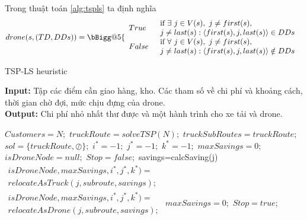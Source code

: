 \documentclass[a4paper,12pt]{report}
\makeatletter
\newcommand{\Vast}{\bBigg@{5}}
\makeatother
\begin{document}
Trong thuật toán  \ref{alg:tspls} ta định nghĩa 
$$
drone(s,(TD,DDs))= \Vast\{
\begin{array}{ll}
		True & \begin{array}{l}
		\text{if}	\	\exists \ j \in V(s),\ j \neq first(s), \\ j \neq last(s): \langle first(s),j,last(s) \rangle \in DDs
		\end{array}  \\
		False &  \begin{array}{l}
		\text{if}	\	\forall \ j \in V(s),\ j \neq first(s), \\ j \neq last(s): \langle first(s),j,last(s) \rangle \notin DDs
		\end{array}
\end{array}
$$
\begin{algorithm}[H]
\caption{TSP-LS heuristic}
\textbf{Input:} Tập các điểm cần giao hàng, kho. Các tham số về chi phí và khoảng cách, thời gian chờ đợi, mức chịu đựng của drone.\\
\textbf{Output:} Chi phí nhỏ nhất thư được và một hành trình cho xe tải và drone.
\begin{algorithmic}[1]
\State $Customers = N ;$
\State $truckRoute = solveTSP(N);$
\State $truckSubRoutes = {truckRoute};$
\State $sol = \{truckRoute,  \oslash \};$
\State $i^*=-1;$
\State $j^*=-1;$
\State $k^*=-1;$
\State $maxSavings = 0;$
\State $isDroneNode = null;$
\State $Stop = f alse;$
\Repeat
{}
\State savings=calcSaving(j)
\State $\begin{array}{l}
	isDroneNode,maxSavings,i^*,j^*,k^*)=\\
	relocateAsTruck(j,subroute,savings);
\end{array}$ 
\Else
\State $\begin{array}{l}
isDroneNode,maxSavings,i^*,j^*,k^*)= \\ relocateAsDrone(j,subroute,savings);
\end{array}$
\EndIf
\EndFor
{} 
\State $maxSavings=0;$
\Else 
\State $Stop=true;$
\EndIf
\EndFor
{}
\end{algorithmic}
\label{alg:tspls}
\end{algorithm}
\end{document}
